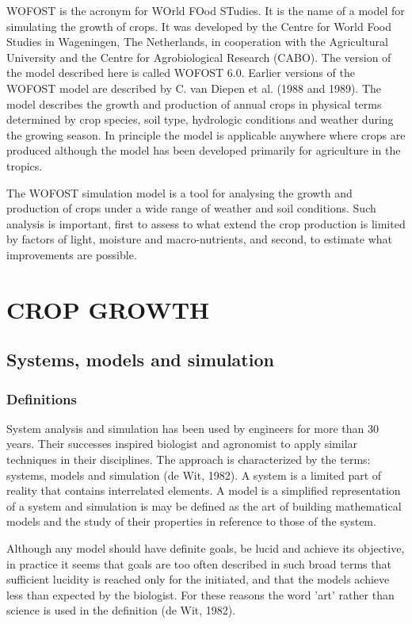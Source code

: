 WOFOST is the acronym for WOrld FOod STudies. It is the name of a model for
simulating the growth of crops. It was developed by the Centre for World Food
Studies in Wageningen, The Netherlands, in cooperation with the Agricultural
University and the Centre for Agrobiological Research (CABO). The version of the
model described here is called WOFOST 6.0. Earlier versions of the WOFOST
model are described by C. van Diepen et al. (1988 and 1989). The model describes
the growth and production of annual crops in physical terms determined by crop
species, soil type, hydrologic conditions and weather during the growing season. In
principle the model is applicable anywhere where crops are produced although the
model has been developed primarily for agriculture in the tropics.

The WOFOST simulation model is a tool for analysing the growth and production of
crops under a wide range of weather and soil conditions. Such analysis is important,
first to assess to what extend the crop production is limited by factors of light,
moisture and macro-nutrients, and second, to estimate what improvements are
possible.

\chapter{CROP GROWTH} 

\section{Systems, models and simulation}

\subsection{Definitions}
System analysis and simulation has been used by engineers for more than 30 years.
Their successes inspired biologist and agronomist to apply similar techniques in their
disciplines. The approach is characterized by the terms: systems, models and 
simulation (de Wit, 1982). A system is a limited part of reality that contains interrelated
elements. A model is a simplified representation of a system and simulation is may be
defined as the art of building mathematical models and the study of their properties
in reference to those of the system.

Although any model should have definite goals, be lucid and achieve its objective, in
practice it seems that goals are too often described in such broad terms that sufficient
lucidity  is reached only for the initiated, and that the models achieve less than
expected by the biologist. For these reasons the word 'art' rather than science is used
in the definition (de Wit, 1982).

